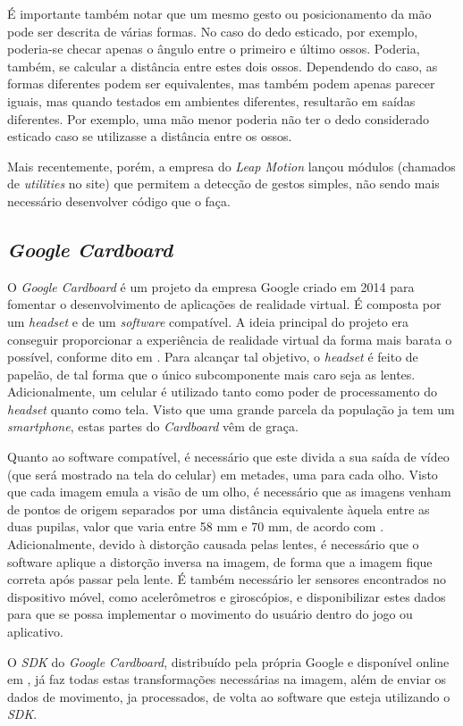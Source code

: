É importante também notar que um mesmo gesto ou posicionamento
da mão pode ser descrita de várias formas. No caso do dedo esticado, 
por exemplo, poderia-se checar apenas o ângulo entre o primeiro e 
último ossos. Poderia, também, se calcular a distância entre estes
dois ossos. Dependendo do caso, as formas diferentes podem ser 
equivalentes, mas também podem apenas parecer iguais, mas quando
testados em ambientes diferentes, resultarão em saídas diferentes.
Por exemplo, uma mão menor poderia não ter o dedo considerado esticado
caso se utilizasse a distância entre os ossos.

Mais recentemente, porém, a empresa do \textit{Leap Motion} 
lançou módulos (chamados de \textit{utilities} no site) 
que permitem a detecção de gestos simples, não sendo 
mais necessário desenvolver código que o faça.

\subsection{\textit{Google Cardboard}}\label{subsec-teo-google-cardboard}

O \textit{Google Cardboard} é um projeto da empresa Google criado em 2014 para 
fomentar o desenvolvimento de aplicações de realidade virtual. É composta por um 
\textit{headset} e de um \textit{software} compatível. A ideia principal do projeto era
conseguir proporcionar a experiência de realidade virtual da forma mais barata 
o possível, conforme dito em \cite{cnet:2016:google-cardboard}. Para 
alcançar tal objetivo, o \textit{headset} é feito de papelão, 
de tal forma que o único subcomponente mais caro seja as lentes. Adicionalmente, 
um celular é utilizado tanto como poder de processamento do \textit{headset} 
quanto como tela. Visto que uma grande parcela da população ja tem um 
\textit{smartphone}, estas partes do \textit{Cardboard} vêm de graça.

Quanto ao software compatível, é necessário que este divida a sua saída de 
vídeo (que será mostrado na tela do celular) em metades, uma para cada olho. 
Visto que cada imagem emula a visão de um olho, é necessário que as imagens 
venham de pontos de origem separados por uma distância equivalente àquela entre 
as duas pupilas, valor que varia entre 58 mm e 70 mm, de acordo com
\cite{dodgson:2004:svariation}. Adicionalmente, devido à distorção causada 
pelas lentes, é necessário que o software aplique a distorção inversa na imagem, 
de forma que a imagem fique correta após passar pela lente. É também necessário 
ler sensores encontrados no dispositivo móvel, como acelerômetros e giroscópios, 
e disponibilizar estes dados para que se possa implementar o movimento do 
usuário dentro do jogo ou aplicativo.

O \textit{SDK} do \textit{Google Cardboard}, distribuído pela própria Google e disponível online 
em \cite{google:2016:cardboardSDK}, já faz todas estas transformações necessárias 
na imagem, além de enviar os dados de movimento, ja processados, de volta ao
software que esteja utilizando o \textit{SDK}.
